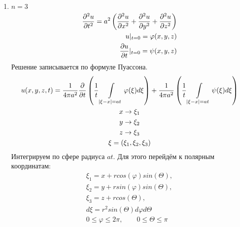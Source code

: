 \documentclass[../main.tex]{subfiles}
\begin{document}
\begin{enumerate}
\item $n=3$
\begin{equation}
    \label{eq:2.7.2}
    \begin{split}
    \frac{\partial ^2u}{\partial t^2} = a^2\left(\frac{\partial ^2u}{\partial x^2}+\frac{\partial ^2u}{\partial y^2}+\frac{\partial ^2u}{\partial z^2}\right)\\
    u|_{t=0} = \varphi(x,y,z)\\
    \frac{\partial u}{\partial t}|_{t=0} = \psi(x,y,z)
    \end{split}
\end{equation}
Решение записывается по формуле Пуассона.
\begin{gather*}
    u(x,y,z,t) = \frac{1}{4\pi a^2}\frac{\partial  }{\partial t}\left(
    \frac{1}{t}\int\displaylimits_{|\xi-x|=at} \varphi(\xi)d\xi\right)
    +
    \frac{1}{4\pi a^2}\left(
    \frac{1}{t}\int\displaylimits_{|\xi-x|=at} \psi(\xi)d\xi\right)\\
    x \rightarrow \xi_1\\
    y \rightarrow \xi_2\\
    z \rightarrow \xi_3\\
    \xi = (\xi_1,\xi_2, \xi_3)
\end{gather*}
Интегрируем по сфере радиуса $at$. Для этого перейдём к
полярным координатам:
\begin{gather*}
    \xi_1 = x + r cos(\varphi) sin(\varTheta), \\
    \xi_2 = y + r sin(\varphi) sin(\varTheta),\\
    \xi_3 = z + r cos(\varTheta),\\
    d\xi = r^2 sin(\varTheta) d\varphi d\varTheta \\
    0 \leq \varphi \leq 2\pi, \qquad 0 \leq \varTheta \leq \pi
\end{gather*}
\end{enumerate}
\end{document}
